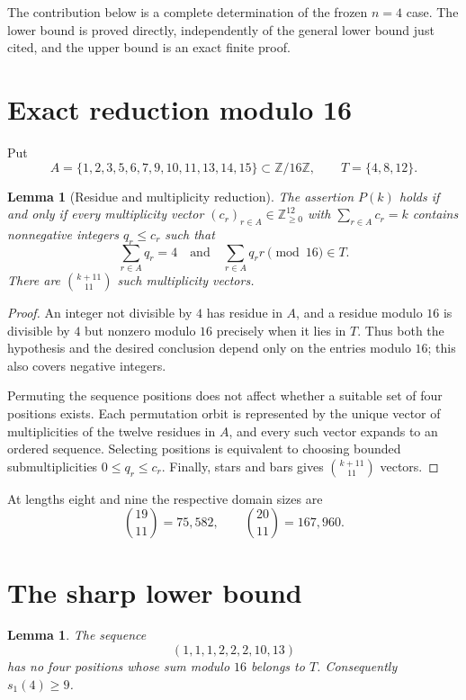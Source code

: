 \documentclass[11pt]{article}
\newtheorem{lemma}[theorem]{Lemma}
\newcommand{\Z}{\mathbb Z}
\begin{document}
The contribution below is a complete determination of the frozen
$n=4$ case.  The lower bound is proved directly, independently of the
general lower bound just cited, and the upper bound is an exact finite
proof.

\section{Exact reduction modulo 16}

Put
\[
 A=\{1,2,3,5,6,7,9,10,11,13,14,15\}\subset\Z/16\Z,
 \qquad T=\{4,8,12\}.
\]

\begin{lemma}[Residue and multiplicity reduction]\label{lem:reduction}
The assertion $P(k)$ holds if and only if every multiplicity vector
$(c_r)_{r\in A}\in\Z_{\geq0}^{12}$ with $\sum_{r\in A}c_r=k$ contains
nonnegative integers $q_r\leq c_r$ such that
\[
  \sum_{r\in A}q_r=4
  \quad\text{and}\quad
  \sum_{r\in A}q_r r\pmod {16}\in T.
\]
There are $\binom{k+11}{11}$ such multiplicity vectors.
\end{lemma}

\begin{proof}
An integer not divisible by $4$ has residue in $A$, and a residue modulo
$16$ is divisible by $4$ but nonzero modulo $16$ precisely when it lies
in $T$.  Thus both the hypothesis and the desired conclusion depend only
on the entries modulo $16$; this also covers negative integers.

Permuting the sequence positions does not affect whether a suitable set
of four positions exists.  Each permutation orbit is represented by the
unique vector of multiplicities of the twelve residues in $A$, and every
such vector expands to an ordered sequence.  Selecting positions is
equivalent to choosing bounded submultiplicities $0\leq q_r\leq c_r$.
Finally, stars and bars gives $\binom{k+11}{11}$ vectors.
\end{proof}

At lengths eight and nine the respective domain sizes are
\[
 \binom{19}{11}=75{,}582,
 \qquad
 \binom{20}{11}=167{,}960.
\]

\section{The sharp lower bound}

\begin{lemma}\label{lem:lower}
The sequence
\[
  (1,1,1,2,2,2,10,13)
\]
has no four positions whose sum modulo $16$ belongs to $T$.
Consequently $s_1(4)\geq9$.
\end{lemma}
\end{document}
